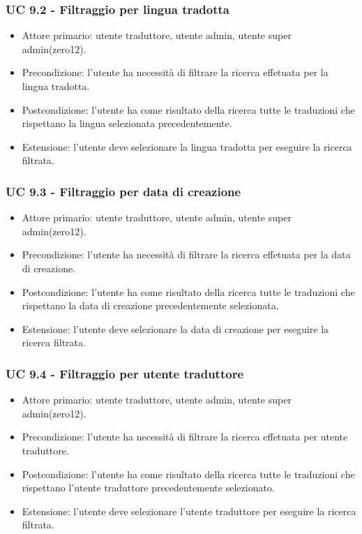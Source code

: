     \subsubsection*{UC 9.2 - Filtraggio per lingua tradotta}
        \begin{itemize}
            \item Attore primario: utente traduttore, utente admin, utente super admin(zero12).
            \item Precondizione: l'utente ha necessità di filtrare la ricerca effetuata per la lingua tradotta.
            \item Postcondizione: l'utente ha come risultato della ricerca tutte le traduzioni che rispettano la lingua selezionata precedentemente. 
            \item Estensione: l'utente deve selezionare la lingua tradotta per eseguire la ricerca filtrata.
        \end{itemize}        
    \subsubsection*{UC 9.3 - Filtraggio per data di creazione}
        \begin{itemize}
            \item Attore primario: utente traduttore, utente admin, utente super admin(zero12).
            \item Precondizione: l'utente ha necessità di filtrare la ricerca effetuata per la data di creazione.
            \item Postcondizione: l'utente ha come risultato della ricerca tutte le traduzioni che rispettano la data di creazione precedentemente selezionata. 
            \item Estensione: l'utente deve selezionare la data di creazione per eseguire la ricerca filtrata.
        \end{itemize}       
    \subsubsection*{UC 9.4 - Filtraggio per utente traduttore}
        \begin{itemize}
            \item Attore primario: utente traduttore, utente admin, utente super admin(zero12).
            \item Precondizione: l'utente ha necessità di filtrare la ricerca effetuata per utente traduttore.
            \item Postcondizione: l'utente ha come risultato della ricerca tutte le traduzioni che rispettano l'utente traduttore precedentemente selezionato. 
            \item Estensione: l'utente deve selezionare l'utente traduttore per eseguire la ricerca filtrata.
        \end{itemize}  
